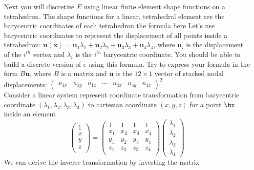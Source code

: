 \documentclass[11pt]{article}
\begin{document}
Next you will discretize $E$ using linear finite element shape functions on a tetrahedron. The shape functions for a linear, tetrahedral element are the barycentric coordinates of each tetrahedron \href{https://en.wikipedia.org/wiki/Barycentric_coordinate_system}{the formula here} Let's use barycentric coordinates to represent the displacement of all points inside a tetrahedron: $\mathbf{u(\mathbf{x})} = \mathbf{u}_1\lambda_1 +\mathbf{u}_2\lambda_2+\mathbf{u}_3\lambda_3+\mathbf{u}_4\lambda_4$, where $\mathbf{u}_i$ is the displacement of the $i^{th}$ vertex and $\lambda_i$ is the $i^{th}$ barycentric coordinate. You should be able to build a discrete version of $\epsilon$ using this formula. Try to express your formula in the form $B\mathbf{u}$, where $B$ is a matrix and $\mathbf{u}$ is the $12\times 1$ vector of stacked nodal displacements: $\begin{pmatrix} u_{1x} & u_{1y} &  u_{1z} & \cdots & u_{4x} & u_{4y} & u_{4z} \end{pmatrix}^T$
$ $\\
Consider a linear system represent coordinate transformation from barycentric coordinate $(\lambda_1,\lambda_2,\lambda_3,\lambda_4)$ to cartesian coordinate $(x,y,z)$ for a point $\bx$ inside an element
\[
    \begin{pmatrix}
        1 \\
        x \\
        y \\
        z \\
    \end{pmatrix}    
    = 
    \begin{pmatrix}
        1 & 1 & 1 & 1 \\
        x_1 & x_2 & x_3 & x_4 \\
        y_1 & y_2 & y_3 & y_4 \\
        z_1 & z_2 & z_3 & z_4 \\
    \end{pmatrix}
    \begin{pmatrix}
        \lambda_1 \\
        \lambda_2 \\
        \lambda_3 \\
        \lambda_4
    \end{pmatrix}
\]
We can derive the inverse transformation by inverting the matrix
\end{document}
